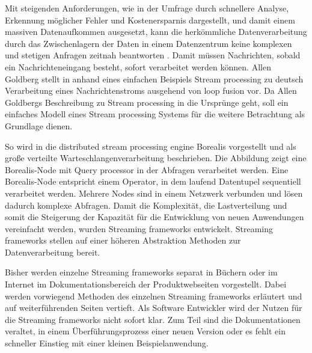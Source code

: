 Mit steigenden Anforderungen, wie in der Umfrage  durch schnellere Analyse, Erkennung möglicher Fehler und Kostenersparnis dargestellt, und damit einem massiven Datenaufkommen ausgesetzt, kann die herkömmliche Datenverarbeitung  durch das Zwischenlagern der Daten in einem Datenzentrum keine komplexen und stetigen Anfragen zeitnah beantworten . Damit müssen Nachrichten, sobald ein Nachrichteneingang besteht, sofort verarbeitet werden können. Allen Goldberg stellt in  anhand eines einfachen Beispiels Stream processing zu deutsch Verarbeitung eines Nachrichtenstroms ausgehend von loop fusion  vor. Da Allen Goldbergs Beschreibung zu Stream processing in die Ursprünge geht, soll ein einfaches Modell eines Stream processing Systems für die weitere Betrachtung als Grundlage dienen.

So wird in  die distributed stream processing engine Borealis vorgestellt und als große verteilte Warteschlangenverarbeitung beschrieben. Die Abbildung  zeigt eine Borealis-Node mit Query processor in der Abfragen verarbeitet werden. Eine Borealis-Node entspricht einem Operator, in dem laufend Datentupel sequentiell verarbeitet werden. Mehrere Nodes sind in einem Netzwerk verbunden und lösen dadurch komplexe Abfragen. Damit die Komplexität, die Lastverteilung und somit die Steigerung der Kapazität für die Entwicklung von neuen Anwendungen vereinfacht werden, wurden Streaming frameworks entwickelt. Streaming frameworks stellen auf einer höheren Abstraktion Methoden zur Datenverarbeitung bereit. 

Bisher werden einzelne Streaming frameworks separat in Büchern oder im Internet im Dokumentationsbereich der Produktwebseiten vorgestellt. Dabei werden vorwiegend Methoden des einzelnen Streaming frameworks erläutert und auf weiterführenden Seiten vertieft. Als Software Entwickler wird der Nutzen für die Streaming frameworks nicht sofort klar. Zum Teil sind die Dokumentationen veraltet, in einem Überführungsprozess einer neuen Version oder es fehlt ein schneller Einstieg mit einer kleinen Beispielanwendung.

